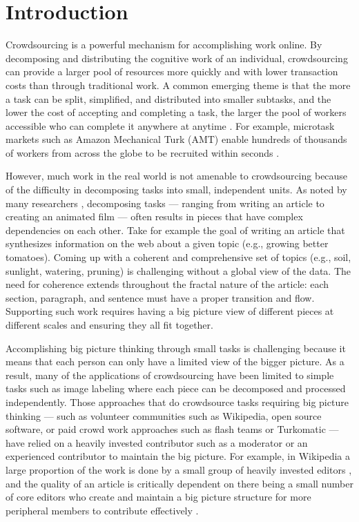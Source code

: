 \section{Introduction}

Crowdsourcing is a powerful mechanism for accomplishing work online. By decomposing and distributing the cognitive work of an individual, crowdsourcing can provide a larger pool of resources more quickly and with lower transaction costs than through traditional work. A common emerging theme is that the more a task can be split, simplified, and distributed into smaller subtasks, and the lower the cost of accepting and completing a task, the larger the pool of workers accessible who can complete it anywhere at anytime \cite{kittur2013future}. For example, microtask markets such as Amazon Mechanical Turk (AMT) enable hundreds of thousands of workers from across the globe to be recruited within seconds \cite{Bernstein:2011:CTS:2047196.2047201}.
 
However, much work in the real world is not amenable to crowdsourcing because of the difficulty in decomposing tasks into small, independent units. As noted by many researchers \cite{bernstein2010soylent, kittur2011crowdforge, little2010turkit, Luther:2013:RLO:2441776.2441891}, decomposing tasks --- ranging from writing an article to creating an animated film --- often results in pieces that have complex dependencies on each other. Take for example the goal of writing an article that synthesizes information on the web about a given topic (e.g., growing better tomatoes). Coming up with a coherent and comprehensive set of topics (e.g., soil, sunlight, watering, pruning) is challenging without a global view of the data. The need for coherence extends throughout the fractal nature of the article: each section, paragraph, and sentence must have a proper transition and flow. Supporting such work requires having a big picture view of different pieces at different scales and ensuring they all fit together.

Accomplishing big picture thinking through small tasks is challenging because it means that each person can only have a limited view of the bigger picture. As a result, many of the applications of crowdsourcing have been limited to simple tasks such as image labeling where each piece can be decomposed and processed independently. Those approaches that do crowdsource tasks requiring big picture thinking --- such as volunteer communities such as Wikipedia, open source software, or paid crowd work approaches such as flash teams \cite{retelny2014expert} or Turkomatic \cite{kulkarni2012collaboratively} --- have relied on a heavily invested contributor such as a moderator or an experienced contributor to maintain the big picture. For example, in Wikipedia a large proportion of the work is done by a small group of heavily invested editors \cite{kittur2007he}, and the quality of an article is critically dependent on there being a small number of core editors who create and maintain a big picture structure for more peripheral members to contribute effectively \cite{kittur2008harnessing}. 

